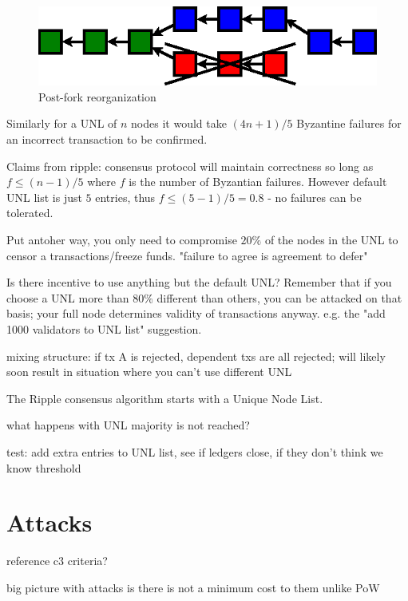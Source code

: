 \documentclass{article}
\begin{document}
\begin{figure}
    \centering
    \includegraphics{figures/unl-clique-reorganized-blockchain.eps}
    \caption{Post-fork reorganization}
    \label{fig:unl-clique-post-fork}
\end{figure}



Similarly for a UNL of $n$ nodes it would
take $(4n + 1)/5$ Byzantine failures for an incorrect transaction to be
confirmed.



Claims from ripple: consensus protocol\cite{ripple-consensus-paper} will maintain correctness so long as $f
\le (n-1)/5$ where $f$ is the number of Byzantian failures. However default UNL
list is just $5$ entries, thus $f \le (5-1)/5 = 0.8$ - no failures can be
tolerated.

Put antoher way, you only need to compromise $20\%$ of the nodes in the UNL to
censor a transactions/freeze funds. "failure to agree is agreement to defer"


Is there incentive to use anything but the default UNL? Remember that if you
choose a UNL more than $80\%$ different than others, you can be attacked on
that basis; your full node determines validity of transactions anyway. e.g. the
"add 1000 validators to UNL list" suggestion.

mixing structure: if tx A is rejected, dependent txs are all rejected; will
likely soon result in situation where you can't use different UNL


The Ripple consensus algorithm starts with a Unique Node List. 


what happens with UNL majority is not reached?

test: add extra entries to UNL list, see if ledgers close, if they don't think we know threshold


\section{Attacks}

reference c3 criteria?

big picture with attacks is there is not a minimum cost to them unlike PoW
\end{document}
